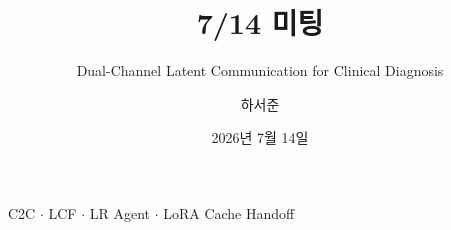 \documentclass[
11pt,notheorems,hyperref={pdfauthor=whatever}
]{beamer}
\title[]{7/14 미팅}
\subtitle{Dual-Channel Latent Communication for Clinical Diagnosis}
\author[]{하서준}
\institute{DGIST}
\date{2026년 7월 14일}
\begin{document}
{
\begin{frame}
  \titlepage
  \vspace{-0.8em}
  \begin{center}
  \scriptsize
  C2C \(\cdot\) LCF \(\cdot\) LR Agent \(\cdot\) LoRA Cache Handoff
  \end{center}
\end{frame}
}
\addtocounter{framenumber}{-1}


\end{document}
